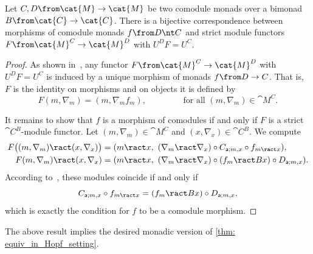 \begin{proposition}\label{prop: functors_as_morphisms_of_monads}
  Let \(C, D \from \cat{M} \to \cat{M}\) be two comodule monads over a bimonad \(B \from \cat{C} \to \cat{C}\).
  There is a bijective correspondence between morphisms of comodule monads \(f \from D \nt C\)
  and strict module functors \(F \from \cat{M}^C \to \cat{M}^D\) with \(U^D F = U^C\).
\end{proposition}
\begin{proof}
  As shown in~\cite[Lemma~1.7]{Bruguieres2007},
  any functor \(F\from \cat{M}^C \to \cat{M}^D\) with \(U^D F = U^C\)
  is induced by a unique morphism of monads \(f \from D \to C\).
  That is, \(F\) is the identity on morphisms and on objects it is defined by
  \[
    F(m, \nabla_m) = (m, \nabla_m f_m), \qquad \qquad \text{ for all } (m, \nabla_m) \in \cat{M}^C.
  \]

  It remains to show that \(f\) is a morphism of comodules
  if and only if
  \(F\) is a strict \(\cat{C}^B\)\hyp{}module functor.
  Let \((m, \nabla_m)\in \cat{M}^C\) and \((x, \nabla_x) \in \cat{C}^B\).
  We compute
  \begin{align*}
    F\big((m, \nabla_m) \ract (x, \nabla_x)\big)
    &= (m \ract x,\ (\nabla_m \ract \nabla_x) \circ C_{\mathsf{a};m,x} \circ f_{m\ract x}), \\
    F(m, \nabla_m) \ract  (x, \nabla_x)
    &= (m \ract x,\ (\nabla_m \ract \nabla_x) \circ (f_m \ract Bx) \circ D_{\mathsf{a}; m, x}).
  \end{align*}
  According to~\cite[Lemma~1.4]{Bruguieres2007}, these modules coincide if and only if
  \[
    C_{\mathsf{a};m,x} \circ f_{m \ract x} = (f_m \ract Bx) \circ D_{\mathsf{a}; m, x},
  \]
  which is exactly the condition for \(f\) to be a comodule morphism.
\end{proof}

The above result implies the desired monadic version of \cref{thm: equiv_in_Hopf_setting}.

